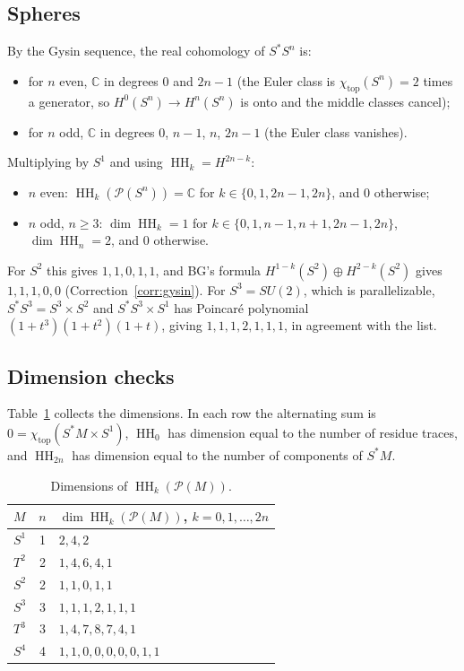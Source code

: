 \documentclass[11pt,oneside,reqno]{article}
\DeclareMathOperator{\HH}{HH}
\newcommand{\C}{\mathbb C}
\newcommand{\cP}{\mathcal P}
\theoremstyle{plain}
\theoremstyle{definition}
\theoremstyle{remark}
\begin{document}
\subsection{Spheres}\label{subsec:exspheres}
By the Gysin sequence, the real cohomology of \(S^*S^n\) is:
\begin{itemize}
\item for \(n\) even, \(\C\) in degrees \(0\) and \(2n-1\) (the Euler class is \(\chi_{\mathrm{top}}(S^n)=2\) times a
generator, so \(H^0(S^n)\to H^n(S^n)\) is onto and the middle classes cancel);
\item for \(n\) odd, \(\C\) in degrees \(0\), \(n-1\), \(n\), \(2n-1\) (the Euler class vanishes).
\end{itemize}
Multiplying by \(S^1\) and using \(\HH_k=H^{2n-k}\):
\begin{itemize}
\item \(n\) even: \(\HH_k(\cP(S^n))=\C\) for \(k\in\{0,1,2n-1,2n\}\), and \(0\) otherwise;
\item \(n\) odd, \(n\ge3\): \(\dim\HH_k=1\) for \(k\in\{0,1,n-1,n+1,2n-1,2n\}\), \(\dim\HH_n=2\), and \(0\) otherwise.
\end{itemize}
For \(S^2\) this gives \(1,1,0,1,1\), and BG's formula \(H^{1-k}(S^2)\oplus H^{2-k}(S^2)\) gives
\(1,1,1,0,0\) (Correction~\ref{corr:gysin}). For \(S^3=SU(2)\), which is parallelizable,
\(S^*S^3=S^3\times S^2\) and \(S^*S^3\times S^1\) has Poincaré polynomial \((1+t^3)(1+t^2)(1+t)\), giving
\(1,1,1,2,1,1,1\), in agreement with the list.

\subsection{Dimension checks}\label{subsec:checks}
Table~\ref{tab:checks} collects the dimensions. In each row the alternating sum is
\(0=\chi_{\mathrm{top}}(S^*M\times S^1)\), \(\HH_0\) has dimension equal to the number of residue traces, and
\(\HH_{2n}\) has dimension equal to the number of components of \(S^*M\).

\begin{table}[htbp]
\centering
\renewcommand{\arraystretch}{1.15}
\begin{tabular}{lcl}
\hline
\(M\) & \(n\) & \(\dim\HH_k(\cP(M))\), \(k=0,1,\dots,2n\)\\
\hline
\(S^1\) & 1 & \(2,4,2\)\\
\(T^2\) & 2 & \(1,4,6,4,1\)\\
\(S^2\) & 2 & \(1,1,0,1,1\)\\
\(S^3\) & 3 & \(1,1,1,2,1,1,1\)\\
\(T^3\) & 3 & \(1,4,7,8,7,4,1\)\\
\(S^4\) & 4 & \(1,1,0,0,0,0,0,1,1\)\\
\hline
\end{tabular}
\caption{Dimensions of \(\HH_k(\cP(M))\).}
\label{tab:checks}
\end{table}
\end{document}

